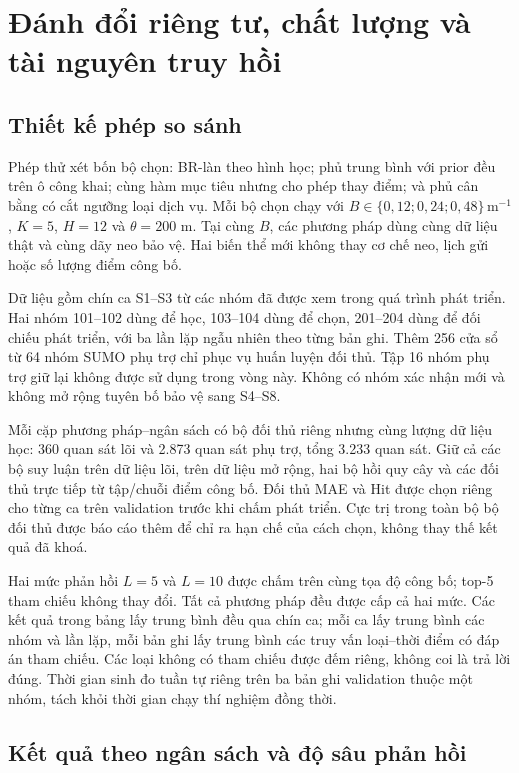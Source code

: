 \section{Đánh đổi riêng tư, chất lượng và tài nguyên truy hồi}
\label{sec:coverage-frontier-experiment}

\subsection{Thiết kế phép so sánh}

Phép thử xét bốn bộ chọn: BR-làn theo hình học; phủ trung bình với prior đều trên ô công khai; cùng hàm mục tiêu nhưng cho phép thay điểm; và phủ cân bằng có cắt ngưỡng loại dịch vụ. Mỗi bộ chọn chạy với $B\in\{0{,}12;0{,}24;0{,}48\}\,\mathrm{m}^{-1}$, $K=5$, $H=12$ và $\theta=200$ m. Tại cùng $B$, các phương pháp dùng cùng dữ liệu thật và cùng dãy neo bảo vệ. Hai biến thể mới không thay cơ chế neo, lịch gửi hoặc số lượng điểm công bố.

Dữ liệu gồm chín ca S1--S3 từ các nhóm đã được xem trong quá trình phát triển. Hai nhóm 101--102 dùng để học, 103--104 dùng để chọn, 201--204 dùng để đối chiếu phát triển, với ba lần lặp ngẫu nhiên theo từng bản ghi. Thêm 256 cửa sổ từ 64 nhóm SUMO phụ trợ chỉ phục vụ huấn luyện đối thủ. Tập 16 nhóm phụ trợ giữ lại không được sử dụng trong vòng này. Không có nhóm xác nhận mới và không mở rộng tuyên bố bảo vệ sang S4--S8.

Mỗi cặp phương pháp--ngân sách có bộ đối thủ riêng nhưng cùng lượng dữ liệu học: 360 quan sát lõi và 2.873 quan sát phụ trợ, tổng 3.233 quan sát. Giữ cả các bộ suy luận trên dữ liệu lõi, trên dữ liệu mở rộng, hai bộ hồi quy cây và các đối thủ trực tiếp từ tập/chuỗi điểm công bố. Đối thủ MAE và Hit được chọn riêng cho từng ca trên validation trước khi chấm phát triển. Cực trị trong toàn bộ bộ đối thủ được báo cáo thêm để chỉ ra hạn chế của cách chọn, không thay thế kết quả đã khoá.

Hai mức phản hồi $L=5$ và $L=10$ được chấm trên cùng tọa độ công bố; top-5 tham chiếu không thay đổi. Tất cả phương pháp đều được cấp cả hai mức. Các kết quả trong bảng lấy trung bình đều qua chín ca; mỗi ca lấy trung bình các nhóm và lần lặp, mỗi bản ghi lấy trung bình các truy vấn loại--thời điểm có đáp án tham chiếu. Các loại không có tham chiếu được đếm riêng, không coi là trả lời đúng. Thời gian sinh đo tuần tự riêng trên ba bản ghi validation thuộc một nhóm, tách khỏi thời gian chạy thí nghiệm đồng thời.

\subsection{Kết quả theo ngân sách và độ sâu phản hồi}


